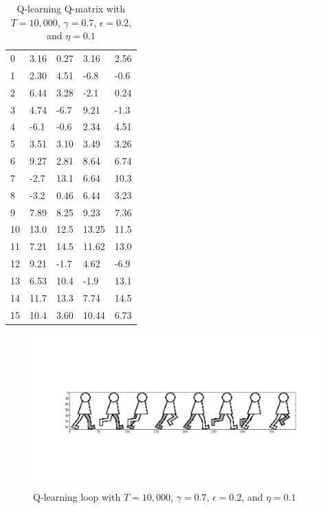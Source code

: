 \documentclass[a4paper]{article}
\begin{document}
\begin{table}[h!]
\centering
\begin{tabular}{l|l|l|l|l}
    0 & 3.16 & 0.27 & 3.16 & 2.56 \\ 
    1 & 2.30 & 4.51 & -6.8 & -0.6 \\ 
    2 & 6.44 & 3.28 & -2.1 & 0.24 \\ 
    3 & 4.74 & -6.7 & 9.21 & -1.3 \\ 
    4 & -6.1 & -0.6 & 2.34 & 4.51 \\ 
    5 & 3.51 & 3.10 & 3.49 & 3.26 \\ 
    6 & 9.27 & 2.81 & 8.64 & 6.74 \\ 
    7 & -2.7 & 13.1 & 6.64 & 10.3 \\ 
    8 & -3.2 & 0.46 & 6.44 & 3.23 \\ 
    9 & 7.89 & 8.25 & 9.23 & 7.36 \\ 
    10 & 13.0 & 12.5 & 13.25 & 11.5 \\ 
    11 & 7.21 & 14.5 & 11.62 & 13.0 \\ 
    12 & 9.21 & -1.7 & 4.62 & -6.9 \\ 
    13 & 6.53 & 10.4 & -1.9 & 13.1 \\ 
    14 & 11.7 & 13.3 & 7.74 & 14.5 \\ 
    15 & 10.4 & 3.60 & 10.44 & 6.73 \\
\end{tabular}
\caption{Q-learning Q-matrix with $T = 10,000$, $\gamma = 0.7$, $\epsilon = 0.2$, and $\eta = 0.1$}
\end{table}

\begin{figure}[h!]
    \centering
    \includegraphics[width=1\textwidth]{qlearning1.png}
    \caption{Q-learning loop with $T = 10,000$, $\gamma = 0.7$, $\epsilon = 0.2$, and $\eta = 0.1$}
\end{figure}
\end{document}
